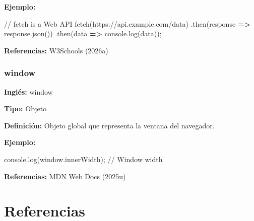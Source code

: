 \documentclass[
  letterpaper,
  DIV=11,
  numbers=noendperiod]{scrreprt}
\newenvironment{Shaded}{\begin{snugshade}}{\end{snugshade}}
\newcommand{\AttributeTok}[1]{\textcolor[rgb]{0.40,0.45,0.13}{#1}}
\newcommand{\BuiltInTok}[1]{\textcolor[rgb]{0.00,0.23,0.31}{#1}}
\newcommand{\CommentTok}[1]{\textcolor[rgb]{0.37,0.37,0.37}{#1}}
\newcommand{\FunctionTok}[1]{\textcolor[rgb]{0.28,0.35,0.67}{#1}}
\newcommand{\KeywordTok}[1]{\textcolor[rgb]{0.00,0.23,0.31}{\textbf{#1}}}
\newcommand{\NormalTok}[1]{\textcolor[rgb]{0.00,0.23,0.31}{#1}}
\newcommand{\OperatorTok}[1]{\textcolor[rgb]{0.37,0.37,0.37}{#1}}
\newcommand{\StringTok}[1]{\textcolor[rgb]{0.13,0.47,0.30}{#1}}
\let\oldsubsection\subsection
\renewcommand{\subsection}{\phantomsection\oldsubsection}
\begin{document}
\textbf{Ejemplo:}

\begin{Shaded}
\begin{Highlighting}[]
\CommentTok{// fetch is a Web API}
\FunctionTok{fetch}\NormalTok{(}\StringTok{\textquotesingle{}https://api.example.com/data\textquotesingle{}}\NormalTok{)}
  \OperatorTok{.}\FunctionTok{then}\NormalTok{(response }\KeywordTok{=\textgreater{}}\NormalTok{ response}\OperatorTok{.}\FunctionTok{json}\NormalTok{())}
  \OperatorTok{.}\FunctionTok{then}\NormalTok{(data }\KeywordTok{=\textgreater{}} \BuiltInTok{console}\OperatorTok{.}\FunctionTok{log}\NormalTok{(data))}\OperatorTok{;}
\end{Highlighting}
\end{Shaded}

\textbf{Referencias:} W3Schools (2026a)

\subsection*{window}\label{glos-window}

\textbf{Inglés:} window

\textbf{Tipo:} Objeto

\textbf{Definición:} Objeto global que representa la ventana del
navegador.

\textbf{Ejemplo:}

\begin{Shaded}
\begin{Highlighting}[]
\BuiltInTok{console}\OperatorTok{.}\FunctionTok{log}\NormalTok{(}\BuiltInTok{window}\OperatorTok{.}\AttributeTok{innerWidth}\NormalTok{)}\OperatorTok{;} \CommentTok{// Window width}
\end{Highlighting}
\end{Shaded}

\textbf{Referencias:} MDN Web Docs (2025u)


\chapter*{Referencias}\label{referencias}

\end{document}

